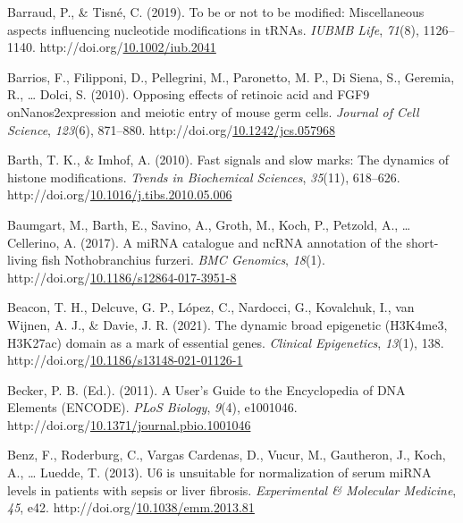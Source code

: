 \documentclass[12pt,twoside]{reedthesis}
\newlength{\cslhangindent}
\newenvironment{CSLReferences}[2] %
 {%
  \setlength{\parindent}{0pt}
  \ifodd #1 \everypar{\setlength{\hangindent}{\cslhangindent}}\ignorespaces\fi
  \ifnum #2 > 0
  \setlength{\parskip}{#2\baselineskip}
  \fi
 }%
 {}
\begin{document}
\begin{CSLReferences}{1}{0}
\leavevmode{}%
Barraud, P., \& Tisné, C. (2019). To be or not to be modified: Miscellaneous aspects influencing nucleotide modifications in tRNAs. \emph{IUBMB Life}, \emph{71}(8), 1126--1140. http://doi.org/\href{https://doi.org/10.1002/iub.2041}{10.1002/iub.2041}

\leavevmode{}%
Barrios, F., Filipponi, D., Pellegrini, M., Paronetto, M. P., Di Siena, S., Geremia, R., \ldots{} Dolci, S. (2010). Opposing effects of retinoic acid and FGF9 onNanos2expression and meiotic entry of mouse germ cells. \emph{Journal of Cell Science}, \emph{123}(6), 871--880. http://doi.org/\href{https://doi.org/10.1242/jcs.057968}{10.1242/jcs.057968}

\leavevmode{}%
Barth, T. K., \& Imhof, A. (2010). Fast signals and slow marks: The dynamics of histone modifications. \emph{Trends in Biochemical Sciences}, \emph{35}(11), 618--626. http://doi.org/\href{https://doi.org/10.1016/j.tibs.2010.05.006}{10.1016/j.tibs.2010.05.006}

\leavevmode{}%
Baumgart, M., Barth, E., Savino, A., Groth, M., Koch, P., Petzold, A., \ldots{} Cellerino, A. (2017). A miRNA catalogue and ncRNA annotation of the short-living fish Nothobranchius furzeri. \emph{BMC Genomics}, \emph{18}(1). http://doi.org/\href{https://doi.org/10.1186/s12864-017-3951-8}{10.1186/s12864-017-3951-8}

\leavevmode{}%
Beacon, T. H., Delcuve, G. P., López, C., Nardocci, G., Kovalchuk, I., van Wijnen, A. J., \& Davie, J. R. (2021). The dynamic broad epigenetic (H3K4me3, H3K27ac) domain as a mark of essential genes. \emph{Clinical Epigenetics}, \emph{13}(1), 138. http://doi.org/\href{https://doi.org/10.1186/s13148-021-01126-1}{10.1186/s13148-021-01126-1}

\leavevmode{}%
Becker, P. B. (Ed.). (2011). A User's Guide to the Encyclopedia of DNA Elements (ENCODE). \emph{PLoS Biology}, \emph{9}(4), e1001046. http://doi.org/\href{https://doi.org/10.1371/journal.pbio.1001046}{10.1371/journal.pbio.1001046}

\leavevmode{}%
Benz, F., Roderburg, C., Vargas Cardenas, D., Vucur, M., Gautheron, J., Koch, A., \ldots{} Luedde, T. (2013). U6 is unsuitable for normalization of serum miRNA levels in patients with sepsis or liver fibrosis. \emph{Experimental \& Molecular Medicine}, \emph{45}, e42. http://doi.org/\href{https://doi.org/10.1038/emm.2013.81}{10.1038/emm.2013.81}


\end{CSLReferences}
\end{document}
